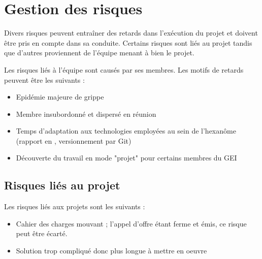 \section{Gestion des risques}

Divers risques peuvent entraîner des retards dans l'exécution du projet et
doivent être pris en compte dans sa conduite. Certains risques sont liés au
projet tandis que d'autres proviennent de l'équipe menant à bien le projet.


Les risques liés à l'équipe sont causés par ses membres. Les motifs de
retards peuvent être les suivants :

\begin{itemize}

\item Epidémie majeure de grippe
\item Membre insubordonné et dispersé en réunion
\item Temps d'adaptation aux technologies employées au sein de l'hexanôme
(rapport en \Latex, versionnement par Git)
\item Découverte du travail en mode "projet" pour certains membres du GEI

\end{itemize}


\subsection{Risques liés au projet}

Les risques liés aux projets sont les suivants :

\begin{itemize}

\item Cahier des charges mouvant ; l'appel d'offre étant ferme et émis, ce
risque peut être écarté.
\item Solution trop compliqué donc plus longue à mettre en oeuvre

\end{itemize}

\pagebreak
